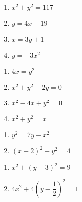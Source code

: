 \documentclass{ximera}
\begin{document}
\begin{multicols}{4} 

\begin{enumerate}

\setcounter{enumi}{\value{HW}}

\item $x^{2} + y^{2} = 117$
\item $y = 4x - 19$
\item $x = 3y + 1$
\item $y = -3x^{2}$

\setcounter{HW}{\value{enumi}}

\end{enumerate}

\end{multicols}

\begin{multicols}{4} 

\begin{enumerate}

\setcounter{enumi}{\value{HW}}

\item $4x = y^2$
\item $x^2 + y^2 - 2y = 0$
\item $x^2 -4x + y^2 = 0$
\item $x^2 + y^2 = x$

\setcounter{HW}{\value{enumi}}

\end{enumerate}

\end{multicols}

\begin{multicols}{2} 

\begin{enumerate}

\setcounter{enumi}{\value{HW}}

\item $y^2 = 7y - x^2$
\item $(x+2)^2 + y^2 = 4$

\setcounter{HW}{\value{enumi}}

\end{enumerate}

\end{multicols}

\begin{multicols}{2} 

\begin{enumerate}

\setcounter{enumi}{\value{HW}}

\item $x^{2} + (y - 3)^{2} = 9$ 
\item $4x^2 + 4\left( y - \dfrac{1}{2} \right)^2 = 1$ \label{equrecttopolarlast}

\setcounter{HW}{\value{enumi}}

\end{enumerate}

\end{multicols}
\end{document}
